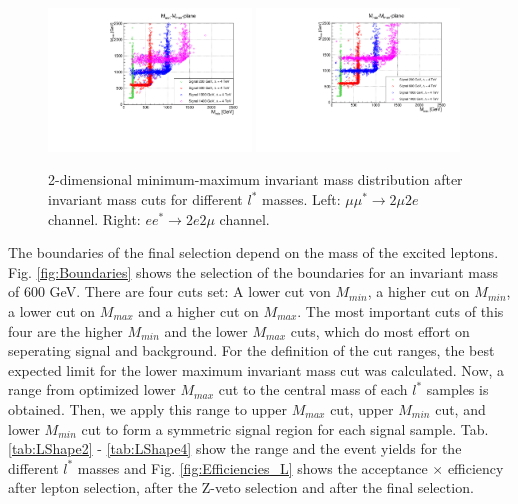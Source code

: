 \begin{figure}[hp]
\begin{center}
\includegraphics[width=0.48\textwidth]{plot/signal_2mu2e.pdf} 
\includegraphics[width=0.48\textwidth]{plot/signal_2e2mu.pdf}
\end{center}
\caption{\label{fig:MminMmaxSignal}2-dimensional minimum-maximum invariant mass distribution after invariant mass cuts for different $l^{*}$ masses. Left: $\mu\mu^{*}\rightarrow 2\mu 2e$ channel. Right: $ee^{*}\rightarrow 2e2\mu$ channel.}
\end{figure}

The boundaries of the final selection depend on the mass of the excited leptons. Fig. \ref{fig:Boundaries} shows the selection of the boundaries for an invariant mass of 600 GeV. There are four cuts set: A lower cut von $M_{min}$, a higher cut on $M_{min}$, a lower cut on $M_{max}$ and a higher cut on $M_{max}$. The most important cuts of this four are the higher $M_{min}$ and the lower $M_{max}$ cuts, which do most effort on seperating signal and background. For the definition of the cut ranges, the best expected limit for the lower maximum invariant mass cut was calculated. Now, a range from optimized lower $M_{max}$ cut to the central mass of each $l^{*}$ samples is obtained. Then, we apply this range to upper $M_{max}$ cut, upper $M_{min}$ cut, and lower $M_{min}$ cut to form a symmetric signal region for each signal sample. Tab. \ref{tab:LShape2} - \ref{tab:LShape4} show the range and the event yields for the different $l^{*}$ masses and Fig. \ref{fig:Efficiencies_L} shows the acceptance $\times$ efficiency after lepton selection, after the Z-veto selection and after the final selection.

